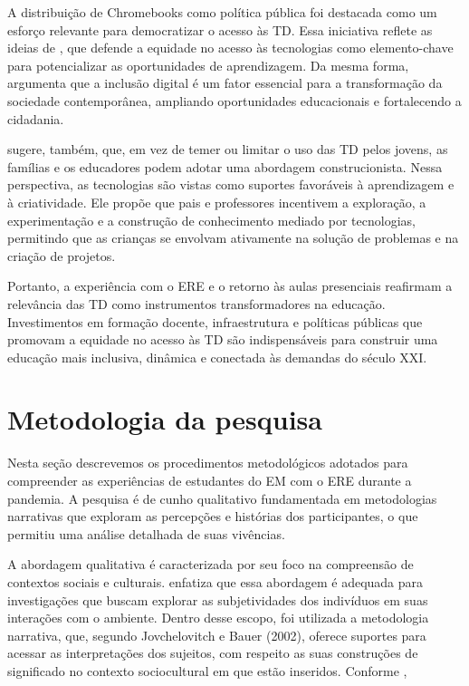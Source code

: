\documentclass[portuguese]{textolivre}
\begin{document}
A distribuição de Chromebooks como política pública foi destacada como um esforço relevante para democratizar o acesso às TD. Essa iniciativa reflete as ideias de \textcite[p. 112]{papert1996}, que defende a equidade no acesso às tecnologias como elemento-chave para potencializar as oportunidades de aprendizagem. Da mesma forma, \textcite[p. 94]{castells2009} argumenta que a inclusão digital é um fator essencial para a transformação da sociedade contemporânea, ampliando oportunidades educacionais e fortalecendo a cidadania.

\textcite{papert1996} sugere, também, que, em vez de temer ou limitar o uso das TD pelos jovens, as famílias e os educadores podem adotar uma abordagem construcionista. Nessa perspectiva, as tecnologias são vistas como suportes favoráveis à aprendizagem e à criatividade. Ele propõe que pais e professores incentivem a exploração, a experimentação e a construção de conhecimento mediado por tecnologias, permitindo que as crianças se envolvam ativamente na solução de problemas e na criação de projetos.

Portanto, a experiência com o ERE e o retorno às aulas presenciais reafirmam a relevância das TD como instrumentos transformadores na educação. Investimentos em formação docente, infraestrutura e políticas públicas que promovam a equidade no acesso às TD são indispensáveis para construir uma educação mais inclusiva, dinâmica e conectada às demandas do século XXI.

\section{Metodologia da pesquisa}\label{sec-formato}
Nesta seção descrevemos os procedimentos metodológicos adotados para compreender as experiências de estudantes do EM com o ERE durante a pandemia. A pesquisa é de cunho qualitativo fundamentada em metodologias narrativas que exploram as percepções e histórias dos participantes, o que permitiu uma análise detalhada de suas vivências.

A abordagem qualitativa é caracterizada por seu foco na compreensão de contextos sociais e culturais. \textcite{creswell2014} enfatiza que essa abordagem é adequada para investigações que buscam explorar as subjetividades dos indivíduos em suas interações com o ambiente. Dentro desse escopo, foi utilizada a metodologia narrativa, que, segundo Jovchelovitch e Bauer (2002), oferece suportes para acessar as interpretações dos sujeitos, com respeito as suas construções de significado no contexto sociocultural em que estão inseridos.
Conforme \textcite[p. 23]{flick2009pt},
\end{document}
